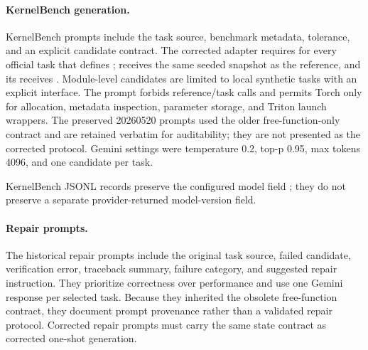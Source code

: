 \paragraph{KernelBench generation.}
KernelBench prompts include the task source, benchmark metadata, tolerance, and an explicit candidate contract. The corrected adapter requires  for every official task that defines ;  receives the same seeded  snapshot as the reference, and its  receives . Module-level  candidates are limited to local synthetic tasks with an explicit  interface. The prompt forbids reference/task calls and permits Torch only for allocation, metadata inspection, parameter storage, and Triton launch wrappers. The preserved 20260520 prompts used the older free-function-only contract and are retained verbatim for auditability; they are not presented as the corrected protocol. Gemini settings were temperature 0.2, top-p 0.95, max tokens 4096, and one candidate per task.

KernelBench JSONL records preserve the configured model field ; they do not preserve a separate provider-returned model-version field.

\paragraph{Repair prompts.}
The historical repair prompts include the original task source, failed candidate, verification error, traceback summary, failure category, and suggested repair instruction. They prioritize correctness over performance and use one Gemini response per selected task. Because they inherited the obsolete free-function contract, they document prompt provenance rather than a validated repair protocol. Corrected repair prompts must carry the same  state contract as corrected one-shot generation.
\endgroup

